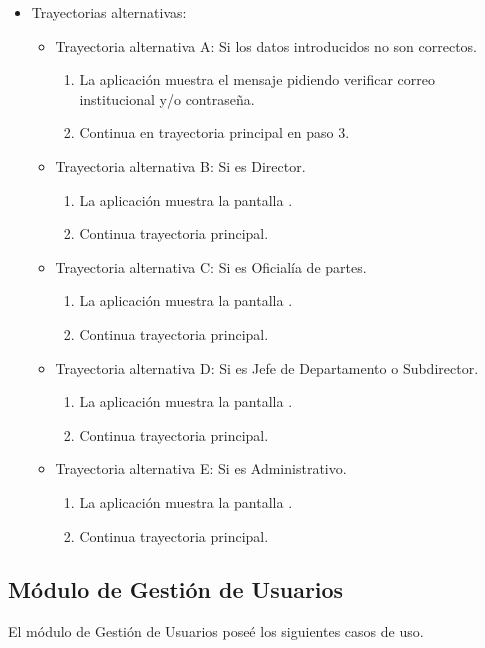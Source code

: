 \begin{itemize}
\begin{enumerate}
		\end{enumerate}
	\item Trayectorias alternativas:
		\begin{itemize}
			\item Trayectoria alternativa A: Si los datos introducidos no son correctos.
				\begin{enumerate}
					\item La aplicación muestra el mensaje  pidiendo verificar correo institucional y/o contraseña.
					\item Continua en trayectoria principal en paso 3.
				\end{enumerate}
			\item Trayectoria alternativa B: Si es Director.
				\begin{enumerate}
					\item La aplicación muestra la pantalla .
					\item Continua trayectoria principal.
				\end{enumerate}
			\item Trayectoria alternativa C: Si es Oficialía de partes.
				\begin{enumerate}
					\item La aplicación muestra la pantalla .
					\item Continua trayectoria principal.
				\end{enumerate}
			\item Trayectoria alternativa D: Si es Jefe de Departamento o Subdirector.
				\begin{enumerate}
					\item La aplicación muestra la pantalla .
					\item Continua trayectoria principal.
				\end{enumerate}
			\item Trayectoria alternativa E: Si es Administrativo.
				\begin{enumerate}
					\item La aplicación muestra la pantalla .
					\item Continua trayectoria principal.
				\end{enumerate}
		\end{itemize}
\end{itemize}
	\subsection{Módulo de Gestión de Usuarios}
	El módulo de Gestión de Usuarios poseé los siguientes casos de uso.
	
